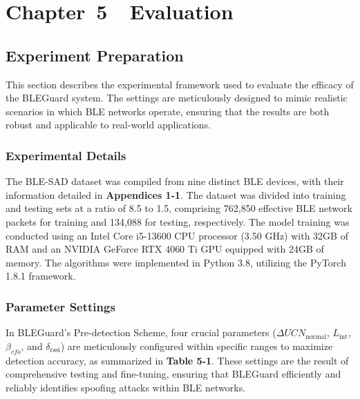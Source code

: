 \section*{Chapter~5~~Evaluation}
\setcounter{section}{5} \setcounter{subsection}{0} 
\setcounter{table}{0} \setcounter{figure}{0} \setcounter{equation}{0}\setcounter{definition}{0}


\subsection{Experiment Preparation}
\noindent This section describes the experimental framework used to evaluate the efficacy of the BLEGuard system. The settings are meticulously designed to mimic realistic scenarios in which BLE networks operate, ensuring that the results are both robust and applicable to real-world applications.



\subsubsection{Experimental Details}

\noindent The BLE-SAD dataset was compiled from nine distinct BLE devices, with their information detailed in \textbf{Appendices 1-1}. The dataset was divided into training and testing sets at a ratio of 8.5 to 1.5, comprising 762,850 effective BLE network packets for training and 134,088 for testing, respectively. The model training was conducted using an Intel Core i5-13600 CPU processor (3.50 GHz) with 32GB of RAM and an NVIDIA GeForce RTX 4060 Ti GPU equipped with 24GB of memory. The algorithms were implemented in Python 3.8, utilizing the PyTorch 1.8.1 framework.

\subsubsection{Parameter Settings}

\noindent In BLEGuard's Pre-detection Scheme, four crucial parameters (\(\Delta UCN_{\text{normal}}\), \(L_{\text{int}}\), \(\beta_{cfo}\), and \(\delta_{\text{rssi}}\)) are meticulously configured within specific ranges to maximize detection accuracy, as summarized in \textbf{Table 5-1}. These settings are the result of comprehensive testing and fine-tuning, ensuring that BLEGuard efficiently and reliably identifies spoofing attacks within BLE networks.

